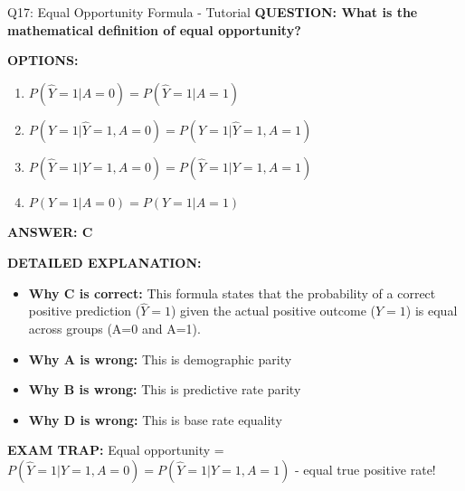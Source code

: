 \documentclass[8pt]{beamer}
\begin{document}
	\begin{frame}{Q17: Equal Opportunity Formula - Tutorial}
		\fontsize{6.5}{7.5}\selectfont
		\textbf{QUESTION: What is the mathematical definition of equal opportunity?}
		
		\vspace{0.1cm}
		\textbf{OPTIONS:}
		\begin{enumerate}
			\item $P(\hat{Y}=1|A=0) = P(\hat{Y}=1|A=1)$
			\item $P(Y=1|\hat{Y}=1,A=0) = P(Y=1|\hat{Y}=1,A=1)$
			\item $P(\hat{Y}=1|Y=1,A=0) = P(\hat{Y}=1|Y=1,A=1)$
			\item $P(Y=1|A=0) = P(Y=1|A=1)$
		\end{enumerate}
		
		\vspace{0.1cm}
		\textcolor{myblue}{\textbf{ANSWER: C}}
		
		\vspace{0.1cm}
		\textbf{DETAILED EXPLANATION:}
		\begin{itemize}
			\item \textbf{Why C is correct:} This formula states that the probability of a correct positive prediction ($\hat{Y}=1$) given the actual positive outcome ($Y=1$) is equal across groups (A=0 and A=1).
			\item \textbf{Why A is wrong:} This is demographic parity
			\item \textbf{Why B is wrong:} This is predictive rate parity
			\item \textbf{Why D is wrong:} This is base rate equality
		\end{itemize}
		
		\textcolor{myred}{\textbf{EXAM TRAP:}} Equal opportunity = \textcolor{myblue}{$P(\hat{Y}=1|Y=1,A=0) = P(\hat{Y}=1|Y=1,A=1)$} - equal true positive rate!
	\end{frame}
	
\end{document}
